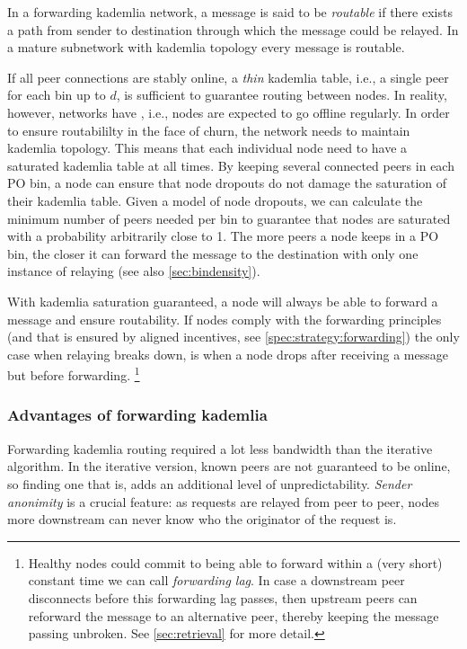 \begin{figure}[htbp]
   \centering
   \caption{}
   \label{fig:forwarding-kademlia}
\end{figure}

In a forwarding kademlia network, a message is said to be \emph{routable} if there exists a path from sender to destination through which the message could be relayed. In a mature subnetwork with kademlia topology every message is routable. 

If all peer connections are stably online, a \emph{thin} kademlia table, i.e., a single peer for each bin up to $d$, is sufficient to guarantee routing between nodes. In reality, however, networks have , i.e., nodes are expected to go offline regularly. In order to ensure routabililty in the face of churn, the network needs to maintain kademlia topology. This means that each individual node need to have a saturated kademlia table at all times. By keeping several connected peers in each PO bin, a node can ensure that node dropouts do not damage the saturation of their kademlia table. Given a model of node dropouts, we can calculate the minimum number of peers needed per bin to guarantee that nodes are saturated with a probability arbitrarily close   to 1. The more peers a node keeps in a PO bin, the closer it can forward the message to the destination with only one instance of relaying (see also \ref{sec:bindensity}).



With kademlia saturation guaranteed, a node will always be able to forward a message and ensure routability. If nodes comply with the forwarding principles (and that is ensured by aligned incentives, see \ref{spec:strategy:forwarding}) the only case when relaying breaks down, is when a node drops after receiving a message but before forwarding.%
%
\footnote{Healthy nodes could commit to being able to forward within a (very short) constant time we can call \emph{forwarding lag}. In case a downstream peer disconnects before this forwarding lag passes, then upstream peers can reforward the message to an alternative peer, thereby keeping the message passing unbroken. See \ref{sec:retrieval} for more detail.
} 

\subsubsection{Advantages of forwarding kademlia}

Forwarding kademlia routing required a lot less bandwidth than the iterative algorithm. In the iterative version, known peers are not guaranteed to be online, so finding one that is, adds an additional level of unpredictability. \emph{Sender anonimity} is a crucial feature: as requests are relayed from peer to peer, nodes more downstream can never know who the originator of the request is. 

